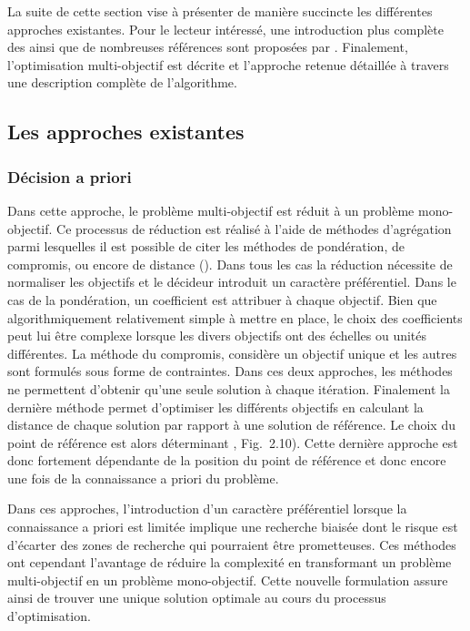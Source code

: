 La suite de cette section vise à présenter de manière succincte les différentes
approches existantes. Pour le lecteur intéressé, une introduction plus complète
des  ainsi que de nombreuses références sont proposées par \textcite{BenMena2000}.
Finalement, l’optimisation multi-objectif est décrite et l’approche retenue
détaillée à travers une description complète de l’algorithme.

\subsection{Les approches existantes} %
\label{sub:les_approches_existantes}
\subsubsection{Décision a priori} %
\label{ssub:decision_a_priori}
Dans cette approche, le problème multi-objectif est réduit à un problème mono-objectif.
Ce processus de réduction est réalisé à l’aide de méthodes d’agrégation parmi lesquelles
il est possible de citer les méthodes de pondération, de compromis,
ou encore de distance (). Dans tous les cas la réduction
nécessite de normaliser les objectifs et le décideur introduit un caractère préférentiel.
Dans le cas de la pondération, un coefficient est attribuer à chaque objectif. Bien que
algorithmiquement relativement simple à mettre en place, le choix des coefficients peut
lui être complexe lorsque les divers objectifs ont des échelles ou unités différentes.
La méthode du compromis, considère un objectif unique et les autres sont formulés
sous forme de contraintes. Dans ces deux approches, les méthodes ne permettent
d’obtenir qu’une seule solution à chaque itération.
Finalement la dernière méthode permet d’optimiser les différents objectifs en calculant
la distance de chaque solution par rapport à une solution de référence. Le choix
du point de référence est alors déterminant \parencite{Collette2002}, Fig.~2.10).
Cette dernière approche est donc fortement dépendante de la position du point de
référence et donc encore une fois de la connaissance a priori du problème.

Dans ces approches, l’introduction d’un caractère préférentiel lorsque la connaissance a priori
est limitée implique une recherche biaisée dont le risque est d’écarter des zones
de recherche qui pourraient être prometteuses. Ces méthodes ont cependant l’avantage
de réduire la complexité en transformant un problème multi-objectif en un problème
mono-objectif. Cette nouvelle formulation assure ainsi de trouver une unique solution
optimale au cours du processus d’optimisation.

